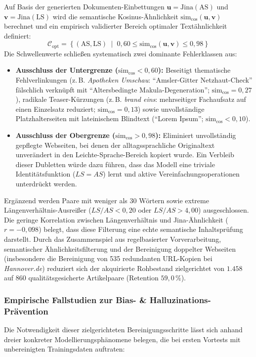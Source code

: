 Auf Basis der generierten Dokumenten-Einbettungen $\mathbf{u} = \text{Jina}(\text{AS})$ und $\mathbf{v} = \text{Jina}(\text{LS})$ wird die semantische Kosinus-Ähnlichkeit $\text{sim}_{\cos}(\mathbf{u}, \mathbf{v})$ berechnet und ein empirisch validierter Bereich optimaler Textähnlichkeit definiert:
\begin{equation}
    \mathcal{C}_{\text{opt}} = \left\{ (\text{AS}, \text{LS}) \;\middle|\; 0{,}60 \le \text{sim}_{\cos}(\mathbf{u}, \mathbf{v}) \le 0{,}98 \right\}
\end{equation}
Die Schwellenwerte schließen systematisch zwei dominante Fehlerklassen aus:
\begin{itemize}
    \item \textbf{Ausschluss der Untergrenze ($\text{sim}_{\cos} < 0{,}60$):} Beseitigt thematische Fehlverlinkungen (z.\,B. \textit{Apotheken Umschau}: \enquote{Amsler-Gitter Netzhaut-Check} fälschlich verknüpft mit \enquote{Altersbedingte Makula-Degeneration}; $\text{sim}_{\cos} = 0{,}27$), radikale Teaser-Kürzungen (z.\,B. \textit{brand eins}: mehrseitiger Fachaufsatz auf einen Einzelsatz reduziert; $\text{sim}_{\cos} = 0{,}13$) sowie unvollständige Platzhalterseiten mit lateinischem Blindtext (\enquote{Lorem Ipsum}; $\text{sim}_{\cos} < 0{,}10$).
    \item \textbf{Ausschluss der Obergrenze ($\text{sim}_{\cos} > 0{,}98$):} Eliminiert unvollständig gepflegte Webseiten, bei denen der alltagssprachliche Originaltext unverändert in den Leichte-Sprache-Bereich kopiert wurde. Ein Verbleib dieser Dubletten würde dazu führen, dass das Modell eine triviale Identitätsfunktion ($LS = AS$) lernt und aktive Vereinfachungsoperationen unterdrückt werden.
\end{itemize}

Ergänzend werden Paare mit weniger als 30 Wörtern sowie extreme Längenverhältnis-Ausreißer ($LS/AS < 0{,}20$ oder $LS/AS > 4{,}00$) ausgeschlossen. Die geringe Korrelation zwischen Längenverhältnis und Jina-Ähnlichkeit ($r = -0{,}098$) belegt, dass diese Filterung eine echte semantische Inhaltsprüfung darstellt. Durch das Zusammenspiel aus regelbasierter Vorverarbeitung, semantischer Ähnlichkeitsfilterung und der Bereinigung doppelter Webseiten (insbesondere die Bereinigung von 535 redundanten URL-Kopien bei \textit{Hannover.de}) reduziert sich der akquirierte Rohbestand zielgerichtet von $1.458$ auf $860$ qualitätsgesicherte Artikelpaare (Retention $59{,}0\,\%$).

\subsubsection{Empirische Fallstudien zur Bias- \& Halluzinations-Prävention}
Die Notwendigkeit dieser zielgerichteten Bereinigungsschritte lässt sich anhand dreier konkreter Modellierungsphänomene belegen, die bei ersten Vortests mit unbereinigten Trainingsdaten auftraten:

